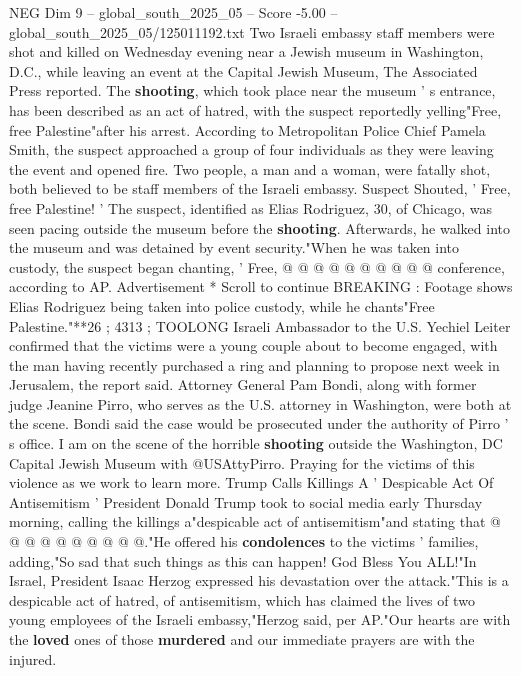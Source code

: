 \begin{textsample}{NEG Dim 9 – global\_south\_2025\_05 – Score -5.00 – global\_south\_2025\_05/125011192.txt}  \label{ex:f9_neg_222}
Two Israeli embassy staff members were shot and killed on Wednesday evening near a Jewish museum in Washington, D.C., while leaving an event at the Capital Jewish Museum, The Associated Press reported.
The \textbf{shooting}, which took place near the museum ' s entrance, has been described as an act of hatred, with the suspect reportedly yelling"Free, free Palestine"after his arrest.
According to Metropolitan Police Chief Pamela Smith, the suspect approached a group of four individuals as they were leaving the event and opened fire.
Two people, a man and a woman, were fatally shot, both believed to be staff members of the Israeli embassy.
Suspect Shouted, ' Free, free Palestine! ' The suspect, identified as Elias Rodriguez, 30, of Chicago, was seen pacing outside the museum before the \textbf{shooting}.
Afterwards, he walked into the museum and was detained by event security."When he was taken into custody, the suspect began chanting, ' Free, @ @ @ @ @ @ @ @ @ @ conference, according to AP.
Advertisement * Scroll to continue BREAKING : Footage shows Elias Rodriguez being taken into police custody, while he chants"Free Palestine."**26 ; 4313 ; TOOLONG Israeli Ambassador to the U.S.
Yechiel Leiter confirmed that the victims were a young couple about to become engaged, with the man having recently purchased a ring and planning to propose next week in Jerusalem, the report said.
Attorney General Pam Bondi, along with former judge Jeanine Pirro, who serves as the U.S. attorney in Washington, were both at the scene.
Bondi said the case would be prosecuted under the authority of Pirro ' s office.
I am on the scene of the horrible \textbf{shooting} outside the Washington, DC Capital Jewish Museum with @USAttyPirro.
Praying for the victims of this violence as we work to learn more.
Trump Calls Killings A ' Despicable Act Of Antisemitism ' President Donald Trump took to social media early Thursday morning, calling the killings a"despicable act of antisemitism"and stating that @ @ @ @ @ @ @ @ @ @."He offered his \textbf{condolences} to the victims ' families, adding,"So sad that such things as this can happen!
God Bless You ALL!"In Israel, President Isaac Herzog expressed his devastation over the attack."This is a despicable act of hatred, of antisemitism, which has claimed the lives of two young employees of the Israeli embassy,"Herzog said, per AP."Our hearts are with the \textbf{loved} ones of those \textbf{murdered} and our immediate prayers are with the injured.

\end{textsample}
